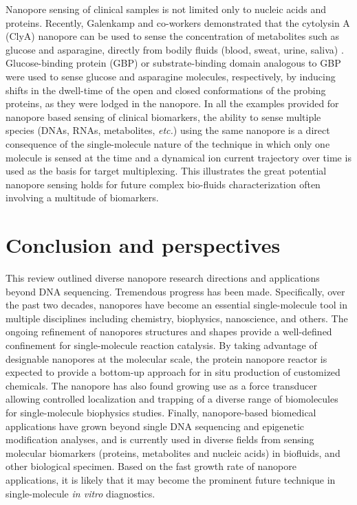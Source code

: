 Nanopore sensing of clinical samples is not limited only to nucleic acids and proteins. Recently, Galenkamp and co-workers demonstrated that the cytolysin A (ClyA) nanopore can be used to sense the concentration of metabolites such as glucose and asparagine, directly from bodily fluids (blood, sweat, urine, saliva) \cite{Galenkamp2018}. Glucose-binding protein (GBP) or substrate-binding domain analogous to GBP were used to sense glucose and asparagine molecules, respectively, by inducing shifts in the dwell-time of the open and closed conformations of the probing proteins, as they were lodged in the nanopore. In all the examples provided for nanopore based sensing of clinical biomarkers, the ability to sense multiple species (DNAs, RNAs, metabolites, \emph{etc.}) using the same nanopore is a direct consequence of the single-molecule nature of the technique in which only one molecule is sensed at the time and a dynamical ion current trajectory over time is used as the basis for target multiplexing. This illustrates the great potential nanopore sensing holds for future complex bio-fluids characterization often involving a multitude of biomarkers.



\section{Conclusion and perspectives}
This review outlined diverse nanopore research directions and applications beyond DNA sequencing. Tremendous progress has been made. Specifically, over the past two decades, nanopores have become an essential single-molecule tool in multiple disciplines including chemistry, biophysics, nanoscience, and others. The ongoing refinement of nanopores structures and shapes provide a well-defined confinement for single-molecule reaction catalysis. By taking advantage of designable nanopores at the molecular scale, the protein nanopore reactor is expected to provide a bottom-up approach for in situ production of customized chemicals. The nanopore has also found growing use as a force transducer allowing controlled localization and trapping of a diverse range of biomolecules for single-molecule biophysics studies. Finally, nanopore-based biomedical applications have grown beyond single DNA sequencing and epigenetic modification analyses, and is currently used in diverse fields from sensing molecular biomarkers (proteins, metabolites and nucleic acids) in biofluids, and other biological specimen. Based on the fast growth rate of nanopore applications, it is likely that it may become the prominent future technique in single-molecule \emph{in vitro} diagnostics.


